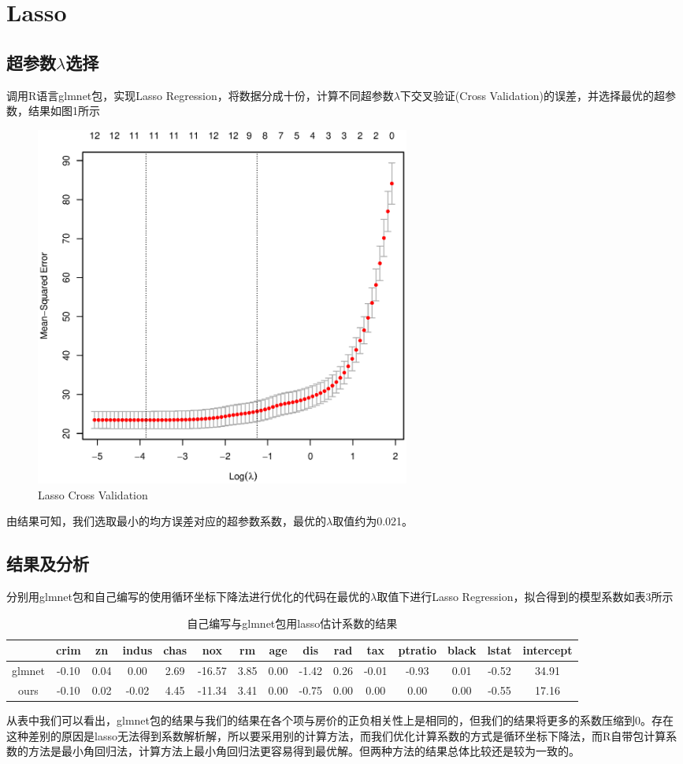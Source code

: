 \section{Lasso}
    \subsection{超参数$\lambda$选择}
    调用R语言glmnet包，实现Lasso Regression，将数据分成十份，计算不同超参数$\lambda$下交叉验证(Cross Validation)的误差，并选择最优的超参数，结果如图1所示
    \begin{figure}[htbp]
        \centering
        \includegraphics[width=0.6\textwidth]{lassocv.eps}
        \caption{Lasso Cross Validation}
    \end{figure}
    由结果可知，我们选取最小的均方误差对应的超参数系数，最优的$\lambda$取值约为0.021。
    \subsection{结果及分析}
    分别用glmnet包和自己编写的使用循环坐标下降法进行优化的代码在最优的$\lambda$取值下进行Lasso Regression，拟合得到的模型系数如表3所示
    \begin{table}[H]
        \centering
        \caption{自己编写与glmnet包用lasso估计系数的结果}
        \begin{tabular}{|c|c|c|c|c|c|c|c|c|c|c|c|c|c|c|}
        \hline
               & crim  & zn   & indus & chas & nox    & rm   & age  & dis   & rad  & tax   & ptratio & black & lstat & intercept \\ \hline
        glmnet & -0.10 & 0.04 & 0.00  & 2.69 & -16.57 & 3.85 & 0.00 & -1.42 & 0.26 & -0.01 & -0.93   & 0.01  & -0.52 & 34.91     \\ \hline
        ours   & -0.10 & 0.02 & -0.02 & 4.45 & -11.34 & 3.41 & 0.00 & -0.75 & 0.00 & 0.00  & 0.00    & 0.00  & -0.55 & 17.16     \\ \hline
        \end{tabular}
    \end{table}
    从表中我们可以看出，glmnet包的结果与我们的结果在各个项与房价的正负相关性上是相同的，但我们的结果将更多的系数压缩到0。存在这种差别的原因是lasso无法得到系数解析解，所以要采用别的计算方法，而我们优化计算系数的方式是循环坐标下降法，而R自带包计算系数的方法是最小角回归法，计算方法上最小角回归法更容易得到最优解。但两种方法的结果总体比较还是较为一致的。
    
